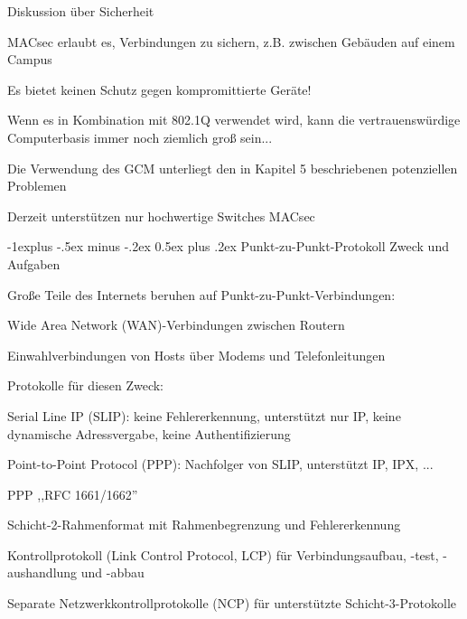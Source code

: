\documentclass[a4paper]{article}
\makeatletter
\renewcommand{\subsection}{\@startsection{subsection}{2}{0mm}%
 {-1explus -.5ex minus -.2ex}%
 {0.5ex plus .2ex}%
 {\normalfont\normalsize\bfseries}}
\makeatother
\begin{document}
\begin{multicols}{3}
      Diskussion über Sicherheit
      \begin{itemize*}
            \item MACsec erlaubt es, Verbindungen zu sichern, z.B. zwischen Gebäuden auf einem Campus
            \item Es bietet keinen Schutz gegen kompromittierte Geräte!
            \item Wenn es in Kombination mit 802.1Q verwendet wird, kann die vertrauenswürdige Computerbasis immer noch ziemlich groß sein...
            \item Die Verwendung des GCM unterliegt den in Kapitel 5 beschriebenen potenziellen Problemen
            \item Derzeit unterstützen nur hochwertige Switches MACsec
      \end{itemize*}

      \subsection{Punkt-zu-Punkt-Protokoll}
      Zweck und Aufgaben
      \begin{itemize*}
            \item Große Teile des Internets beruhen auf Punkt-zu-Punkt-Verbindungen:
            \begin{itemize*}
                  \item Wide Area Network (WAN)-Verbindungen zwischen Routern
                  \item Einwahlverbindungen von Hosts über Modems und Telefonleitungen
            \end{itemize*}
            \item Protokolle für diesen Zweck:
            \begin{itemize*}
                  \item Serial Line IP (SLIP): keine Fehlererkennung, unterstützt nur IP, keine dynamische Adressvergabe, keine Authentifizierung
                  \item Point-to-Point Protocol (PPP): Nachfolger von SLIP, unterstützt IP, IPX, ...
            \end{itemize*}
            \item PPP ,,RFC 1661/1662''
            \begin{itemize*}
                  \item Schicht-2-Rahmenformat mit Rahmenbegrenzung und Fehlererkennung
                  \item Kontrollprotokoll (Link Control Protocol, LCP) für Verbindungsaufbau, -test, -aushandlung und -abbau
                  \item Separate Netzwerkkontrollprotokolle (NCP) für unterstützte Schicht-3-Protokolle
            \end{itemize*}
      \end{itemize*}


\end{multicols}
\end{document}
